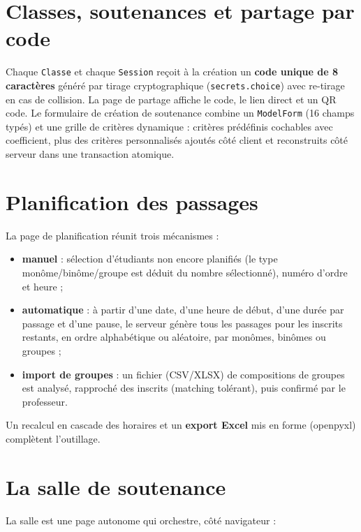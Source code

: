 \documentclass[12pt,a4paper]{report}
\begin{document}
\section{Classes, soutenances et partage par code}

Chaque \texttt{Classe} et chaque \texttt{Session} reçoit à la création un
\textbf{code unique de 8 caractères} généré par tirage cryptographique
(\texttt{secrets.choice}) avec re-tirage en cas de collision. La page de
partage affiche le code, le lien direct et un QR code. Le formulaire de
création de soutenance combine un \texttt{ModelForm} (16 champs typés) et une
grille de critères dynamique : critères prédéfinis cochables avec coefficient,
plus des critères personnalisés ajoutés côté client et reconstruits côté
serveur dans une transaction atomique.

\section{Planification des passages}

La page de planification réunit trois mécanismes :
\begin{itemize}
  \item \textbf{manuel} : sélection d'étudiants non encore planifiés
        (le type monôme/binôme/groupe est déduit du nombre sélectionné),
        numéro d'ordre et heure ;
  \item \textbf{automatique} : à partir d'une date, d'une heure de début,
        d'une durée par passage et d'une pause, le serveur génère tous les
        passages pour les inscrits restants, en ordre alphabétique ou
        aléatoire, par monômes, binômes ou groupes ;
  \item \textbf{import de groupes} : un fichier (CSV/XLSX) de compositions de
        groupes est analysé, rapproché des inscrits (matching tolérant), puis
        confirmé par le professeur.
\end{itemize}
Un recalcul en cascade des horaires et un \textbf{export Excel} mis en forme
(openpyxl) complètent l'outillage.

\section{La salle de soutenance}

La salle est une page autonome qui orchestre, côté navigateur :
\end{document}
